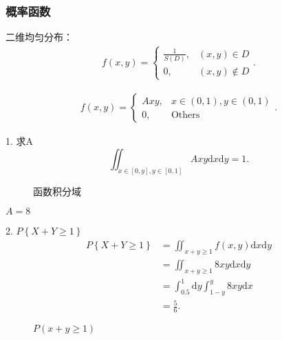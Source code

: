 \subsubsection*{概率函数}%
\label{subsub:概率函数}
\begin{notation}
    二维均匀分布：
    \begin{align*}
        f\left( x,y \right) =\begin{cases}
            {\frac{1}{S\left( D \right) }},&\left( x,y \right) \in D\\
            0 ,& \left( x,y \right) \not\in D
        \end{cases}
    .\end{align*}
\end{notation}
\begin{eg}
    \begin{align*}
        f\left( x,y \right) =\begin{cases}
            Axy,&x\in \left( 0,1 \right) ,y\in \left( 0,1 \right) \\
            0,&\text{Others}
        \end{cases}
    .\end{align*}

    1. 求A
    \[
        \iint_{x\in [0,y] ,y\in [0,1] } Axy \mathrm{d}x\mathrm{d}y=1
    .\] 
\begin{figure}[ht]
    \centering
    \caption{函数积分域}
    \label{fig:函数积分域}
\end{figure}
    $A=8$

    2. $P\left\{ X+Y\ge 1 \right\} $ 
    \begin{align*}
        P\left\{ X+Y\ge 1 \right\} &=\iint_{x+y\ge 1} f\left( x,y \right)  \mathrm{d}x\mathrm{d}y \\
        &= \iint_{x+y\ge 1} 8xy \mathrm{d}x\mathrm{d}y \\
        &= \int_{0.5}^{1} \mathrm{d}y \int_{1-y}^{y} 8xy \mathrm{d}x \\
        &= \frac{5}{6}
    .\end{align*}

    \begin{figure}[htbp]
        \centering
        \caption{$P(x+y\ge 1)$}
        \label{P(x+y>= 1)}
\end{figure}
\end{eg}
